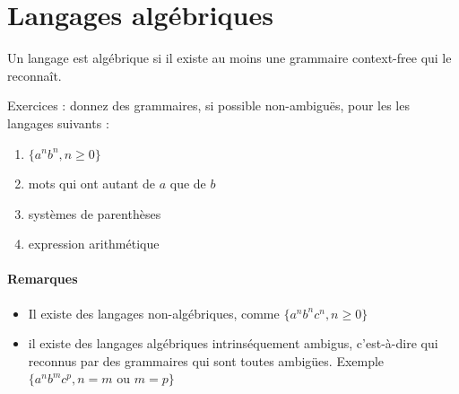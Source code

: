 \documentclass[10pt,twoside]{article}
\begin{document}
\section{Langages algébriques}

Un langage est algébrique si il existe au moins une grammaire
context-free qui le reconnaît.

Exercices : donnez des grammaires, si possible non-ambiguës, pour les
les langages suivants :

\begin{enumerate}
\item $\{ a^n b^n, n \ge 0 \}$
\item mots qui ont autant de $a$ que de $b$
\item systèmes de parenthèses
\item expression arithmétique
\end{enumerate}

\paragraph{Remarques}
\begin{itemize}
\item Il existe des langages non-algébriques, comme 
$\{ a^n b^n c^n, n \ge 0 \}$
\item il existe des langages algébriques intrinséquement ambigus,
c'est-à-dire qui reconnus par des grammaires qui sont toutes ambigües.
Exemple  
$\{ a^n b^m c^p, n = m \mbox{ ou } m = p \}$
\end{itemize}
\end{document}
